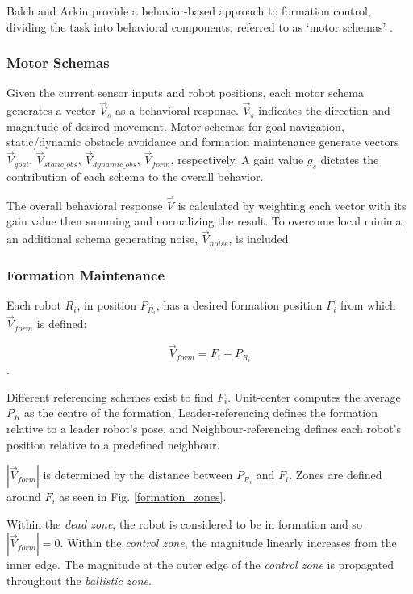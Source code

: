 \documentclass[letterpaper, 10 pt, conference]{ieeeconf}  %
\begin{document}
Balch and Arkin provide a behavior-based approach to formation control, dividing the task into behavioral components, referred to as `motor schemas' \cite{c2}. 

\subsubsection*{Motor Schemas}

Given the current sensor inputs and robot positions, each motor schema generates a vector $\vec{V}_s$ as a behavioral response. $\vec{V}_s$ indicates the direction and magnitude of desired movement. Motor schemas for goal navigation, static/dynamic obstacle avoidance and formation maintenance generate vectors $\vec{V}_{goal}$, $\vec{V}_{static\_obs}$, $\vec{V}_{dynamic\_obs}$, $\vec{V}_{form}$, respectively. A gain value $g_s$ dictates the contribution of each schema to the overall behavior.  

The overall behavioral response $\vec{V}$ is calculated by weighting each vector with its gain value then summing and normalizing the result. To overcome local minima, an additional schema generating noise,  $\vec{V}_{noise}$, is included.

\subsubsection*{Formation Maintenance}
Each robot $R_i$, in position $P_{R_i}$, has a desired formation position $F_i$ from which $\vec{V}_{form}$ is defined:

\[\vec{V}_{form} = F_i - P_{R_i}\].

Different referencing schemes exist to find $F_i$. Unit-center computes the average $P_R$ as the centre of the formation, Leader-referencing defines the formation relative to a leader robot's pose, and Neighbour-referencing defines each robot's position relative to a predefined neighbour.

$|\vec{V}_{form}|$ is determined by the distance between $P_{R_i}$ and $F_i$. Zones are defined around $F_{i}$ as seen in Fig. \ref{formation_zones}. 

Within the \textit{dead zone}, the robot is considered to be in formation and so $|\vec{V}_{form}| = 0$. Within the \textit{control zone}, the magnitude linearly increases from the inner edge. The magnitude at the outer edge of the \textit{control zone} is propagated throughout the \textit{ballistic zone}.
\end{document}
